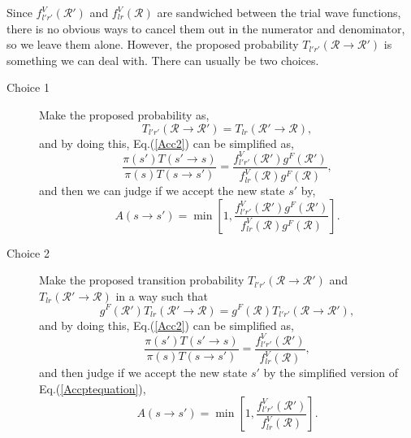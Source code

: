 \documentclass[12pt,letterpaper,UTF8]{report}
\begin{document}
Since $f^V_{l'r'}(\mathcal{R}')$ and $f^V_{lr}(\mathcal{R})$ are sandwiched between the trial wave functions, there is no obvious ways to cancel them out in the numerator and denominator, so we leave them alone.
However, the proposed probability $T_{l'r'}(\mathcal{R} \rightarrow \mathcal{R}')$ is something we can deal with.
There can usually be two choices.
\begin{description}
  \item[Choice 1] Make the proposed probability as,
\begin{equation}
T_{l'r'}(\mathcal{R} \rightarrow \mathcal{R}') = T_{lr}(\mathcal{R}' \rightarrow \mathcal{R})  ,
\label{tlrnewtlrold}
\end{equation}
and by doing this, Eq.(\ref{Acc2}) can be simplified as,
\begin{equation}
\frac{\pi(s')T(s'\rightarrow s)}{\pi(s) T(s\rightarrow s')} =
\frac{ f^V_{l'r'}(\mathcal{R}') g^F(\mathcal{R}')  }{ f^V_{lr}(\mathcal{R}) g^F(\mathcal{R})  }, \label{acc2simp2}
\end{equation}
and then we can judge if we accept the new state $s'$ by,
\begin{equation}
A(s\rightarrow s')=
\min \left[  1, \frac{ f^V_{l'r'}(\mathcal{R}') g^F(\mathcal{R}')  }{ f^V_{lr}(\mathcal{R}) g^F(\mathcal{R})  } \right] .
\label{Accptequationsimp2}
\end{equation}
  \item[Choice 2] Make the proposed transition probability $T_{l'r'}(\mathcal{R} \rightarrow \mathcal{R}')$ and $T_{lr}(\mathcal{R}' \rightarrow \mathcal{R})$ in a way such that
\begin{equation}
g^F(\mathcal{R}') T_{lr}(\mathcal{R}' \rightarrow \mathcal{R}) = g^F(\mathcal{R}) T_{l'r'}(\mathcal{R} \rightarrow \mathcal{R}')   ,
\label{gtnewgtold}
\end{equation}
and by doing this, Eq.(\ref{Acc2}) can be simplified as,
\begin{equation}
\frac{\pi(s')T(s'\rightarrow s)}{\pi(s) T(s\rightarrow s')} = \frac{ f^V_{l'r'}(\mathcal{R}') }{ f^V_{lr}(\mathcal{R})  }, \label{acc2simp}
\end{equation}
and then judge if we accept the new state $s'$ by the simplified version of Eq.(\ref{Accptequation}),
\begin{equation}
A(s\rightarrow s')=
\min \left[  1, \frac{ f^V_{l'r'}(\mathcal{R}') }{ f^V_{lr}(\mathcal{R})  }\right] .
\label{Accptequationsimp}
\end{equation}
\end{description}
\end{document}
